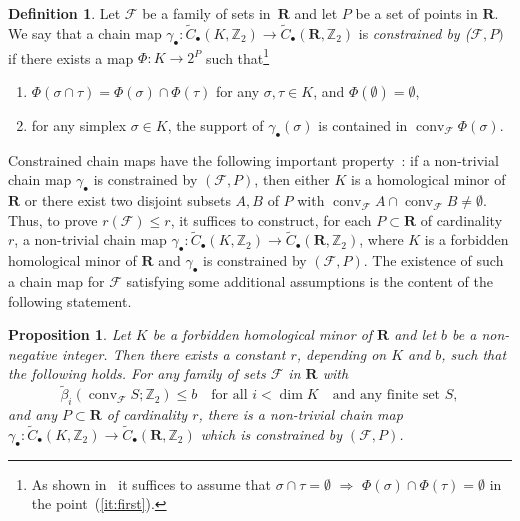 \documentclass[a4paper,12pt]{amsart}
\newcommand{\Z}{\mathbb{Z}} 	%
\newcommand{\F}{\mathcal{F}} 	%
\newtheorem{proposition}[theorem]{Proposition}
\theoremstyle{definition}
\newtheorem{definition}[theorem]{Definition}
\begin{document}
\begin{definition}\cite{bettiRadon}\label{def:constrained_chain_map}
Let $\mathcal F$ be a family of sets in~$\mathbf R$ and let $P$ be a set of points in $\mathbf R$. We say that a chain map  $\gamma_\bullet: \widetilde C_\bullet(K, \mathbb Z_2) \to \widetilde C_\bullet(\mathbf R, \mathbb Z_2)$  is \emph{constrained by ($\mathcal F, P)$} if there exists a map $\Phi: K \to 2^P$  such that\footnote{As shown in~\cite{radonPolynomial} it suffices to assume that $\sigma\cap \tau=\emptyset$ $\Rightarrow$ $\Phi(\sigma)\cap \Phi(\tau)=\emptyset$ in the point~(\ref{it:first}). }
\begin{enumerate}
    \item $\Phi(\sigma \cap \tau) = \Phi(\sigma) \cap \Phi(\tau)$ for any $\sigma, \tau \in K$, and $\Phi(\emptyset)=\emptyset$,\label{it:first}
    \item for any simplex $\sigma \in K$, the support of $\gamma_\bullet(\sigma)$ is contained in $\operatorname{conv}_{\mathcal F} \Phi(\sigma)$. \label{it:second}
\end{enumerate}
\end{definition}




Constrained chain maps have the following important property~\cite[Lemma 3.5]{bettiRadon}: if a non-trivial chain map $\gamma_\bullet$ is constrained by $(\mathcal F, P)$, then either $K$ is a homological minor of $\mathbf R$ or there exist two disjoint subsets $A,B$ of $P$ with $\operatorname{conv}_{\mathcal F}A \cap \operatorname{conv}_{\mathcal{F}}B \neq \emptyset$.
Thus, to prove $r(\mathcal F)\leq r$, it suffices to construct, for each $P \subset \mathbf R$ of cardinality $r$, a non-trivial chain map $\gamma_\bullet: \widetilde C_\bullet(K,\mathbb Z_2) \to \widetilde C_\bullet(\mathbf R, \Z_2)$, where $K$ is a forbidden homological minor of $\mathbf R$ and $\gamma_\bullet$ is constrained by $(\mathcal F,P)$. The existence of such a chain map for $\F$ satisfying some additional assumptions is the content of the following statement.

\begin{proposition}\cite[Prop. 3.6 and 3.7]{bettiRadon}\label{p:chain_map}
 Let $K$ be a forbidden homological minor of $\mathbf R$ and let $b$ be a non-negative integer. Then there exists a constant $r$, depending on $K$ and $b$, such that the following holds. 
   For any family of sets $\mathcal F$ in $\mathbf R$ with  \[\widetilde{\beta}_i(\operatorname{conv}_{\mathcal F}S;\Z_2)\leq b\quad \text{for all }i< \dim K \quad \text{and any finite set } S, \] 
   and any $P \subset \mathbf R$ of cardinality $r$, there is a non-trivial chain map $\gamma_\bullet: \widetilde C_\bullet(K,\mathbb Z_2) \to \widetilde C_\bullet(\mathbf R, \Z_2)$ which is constrained by $(\mathcal F,P)$.
\end{proposition}
\end{document}
